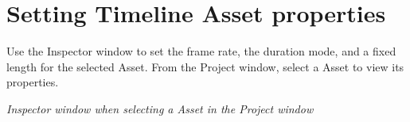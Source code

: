 \chapter{Setting Timeline Asset properties}
\hypertarget{md__hey_tea_9_2_library_2_package_cache_2com_8unity_8timeline_0d1_87_85_2_documentation_0i_2insp__tl}{}\label{md__hey_tea_9_2_library_2_package_cache_2com_8unity_8timeline_0d1_87_85_2_documentation_0i_2insp__tl}
\label{md__hey_tea_9_2_library_2_package_cache_2com_8unity_8timeline_0d1_87_85_2_documentation_0i_2insp__tl_autotoc_md4681}%
%
 Use the Inspector window to set the frame rate, the duration mode, and a fixed length for the selected  Asset. From the Project window, select a  Asset to view its properties.



{\itshape Inspector window when selecting a  Asset in the Project window}

